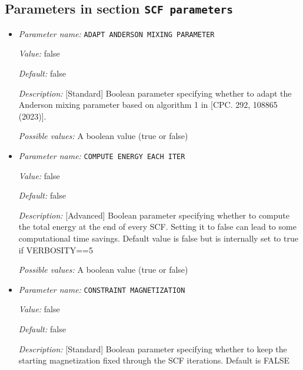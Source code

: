 \subsection{Parameters in section \tt SCF parameters}
\label{parameters:SCF_20parameters}

\begin{itemize}
\item {\it Parameter name:} {\tt ADAPT ANDERSON MIXING PARAMETER}
\label{parameters:SCF parameters/ADAPT ANDERSON MIXING PARAMETER}
\label{parameters:SCF_20parameters/ADAPT_20ANDERSON_20MIXING_20PARAMETER}


{\it Value:} false


{\it Default:} false


{\it Description:} [Standard] Boolean parameter specifying whether to adapt the Anderson mixing parameter based on algorithm 1 in [CPC. 292, 108865 (2023)].


{\it Possible values:} A boolean value (true or false)
\item {\it Parameter name:} {\tt COMPUTE ENERGY EACH ITER}
\label{parameters:SCF parameters/COMPUTE ENERGY EACH ITER}
\label{parameters:SCF_20parameters/COMPUTE_20ENERGY_20EACH_20ITER}


{\it Value:} false


{\it Default:} false


{\it Description:} [Advanced] Boolean parameter specifying whether to compute the total energy at the end of every SCF. Setting it to false can lead to some computational time savings. Default value is false but is internally set to true if VERBOSITY==5


{\it Possible values:} A boolean value (true or false)
\item {\it Parameter name:} {\tt CONSTRAINT MAGNETIZATION}
\label{parameters:SCF parameters/CONSTRAINT MAGNETIZATION}
\label{parameters:SCF_20parameters/CONSTRAINT_20MAGNETIZATION}


{\it Value:} false


{\it Default:} false


{\it Description:} [Standard] Boolean parameter specifying whether to keep the starting magnetization fixed through the SCF iterations. Default is FALSE



\end{itemize}
